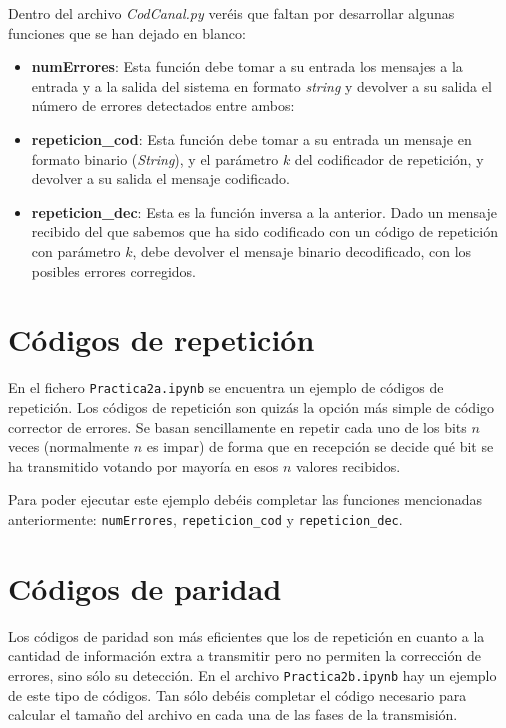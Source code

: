 \documentclass[es,practica]{uah}
\begin{document}
Dentro del archivo \emph{CodCanal.py} veréis que faltan por desarrollar algunas funciones que se han dejado en blanco:
\begin{itemize}
	\item {\bf numErrores}: Esta función debe tomar a su entrada los mensajes a la entrada y a la salida del sistema en formato \emph{string} y devolver a su salida el número de errores detectados entre ambos:

	\item {\bf repeticion\_cod}: Esta función debe tomar a su entrada un mensaje en formato binario (\emph{String}), y el parámetro $k$ del codificador de repetición, y devolver a su salida el mensaje codificado. 

	\item {\bf repeticion\_dec}: Esta es la función inversa a la anterior. Dado un mensaje recibido del que sabemos que ha sido codificado con un código de repetición con parámetro $k$, debe devolver el mensaje binario decodificado, con los posibles errores corregidos. 
\end{itemize}


\section{Códigos de repetición}

En el fichero \texttt{Practica2a.ipynb} se encuentra un ejemplo de códigos de repetición. Los códigos de repetición son quizás la opción más simple de código corrector de errores. Se basan sencillamente en repetir cada uno de los bits $n$ veces (normalmente $n$ es impar) de forma que en recepción se decide qué bit se ha transmitido votando por mayoría en esos $n$ valores recibidos.

Para poder ejecutar este ejemplo debéis completar las funciones mencionadas anteriormente: \texttt{numErrores}, \texttt{repeticion\_cod} y \texttt{repeticion\_dec}. 

\section{Códigos de paridad}

Los códigos de paridad son más eficientes que los de repetición en cuanto a la cantidad de información extra a transmitir pero no permiten la corrección de errores, sino sólo su detección. En el archivo \texttt{Practica2b.ipynb} hay un ejemplo de este tipo de códigos. Tan sólo debéis completar el código necesario para calcular el tamaño del archivo en cada una de las fases de la transmisión. 
\end{document}
